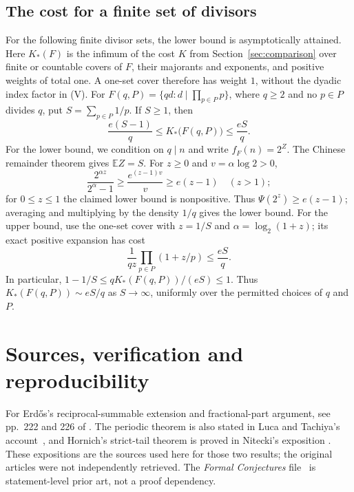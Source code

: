 \documentclass[11pt]{article}
\begin{document}
\subsection*{The cost for a finite set of divisors}
For the following finite divisor sets, the lower bound is asymptotically
attained. Here $K_*(F)$ is the infimum of the cost $K$ from
Section~\ref{sec:comparison} over finite or countable covers of $F$, their majorants and exponents,
and positive weights of total one. A one-set cover therefore has weight
$1$, without the dyadic index factor in (V).
For $F(q,P)=\{qd:d\mid\prod_{p\in P}p\}$, where $q\ge2$ and no $p\in P$
divides $q$, put $S=\sum_{p\in P}1/p$.  If $S\ge1$, then
\begin{equation}
 \frac{e(S-1)}q\le K_*\bigl(F(q,P)\bigr)\le\frac{eS}q.
 \label{eq:optimal-cube-cost}
\end{equation}
For the lower bound, we condition on $q\mid n$ and write
$f_F(n)=2^Z$.  The Chinese remainder theorem gives
$\mathbb EZ=S$.  For $z\ge0$ and $v=\alpha\log2>0$,
\[
 \frac{2^{\alpha z}}{2^\alpha-1}
 \ge\frac{e^{(z-1)v}}v\ge e(z-1)\quad(z>1);
\]
for $0\le z\le1$ the claimed lower bound is nonpositive.
Thus $\Psi(2^z)\ge e(z-1)$; averaging and multiplying by the
density $1/q$ gives the lower bound. For the upper bound, use the
one-set cover with $z=1/S$ and
$\alpha=\log_2(1+z)$; its exact positive expansion has cost
\[
 \frac1{qz}\prod_{p\in P}(1+z/p)\le\frac{eS}q.
\]
In particular,
$1-1/S\le qK_*(F(q,P))/(eS)\le1$.
Thus $K_*(F(q,P))\sim eS/q$ as $S\to\infty$, uniformly over the
permitted choices of $q$ and $P$.

\section{Sources, verification and reproducibility}\label{app:sources}

\evidenceparagraph{\evidencerecordurl}

For Erd\H{o}s's reciprocal-summable extension and fractional-part
argument, see pp.~222 and 226 of \cite{erdos1968}. The periodic theorem
\cite{lucatachiya2014periodic} is also stated in Luca and Tachiya's account~\cite[Theorem~A and Example~2, pp.~139--140]{lucatachiya2017},
and Hornich's strict-tail theorem is proved in Nitecki's exposition
\cite[Theorem~4(1)]{nitecki2013}. These expositions are the sources used
here for those two results; the original articles were not independently
retrieved.  The \emph{Formal Conjectures}
file~\cite{formalconjectures257} is statement-level prior art, not a
proof dependency.
\end{document}
